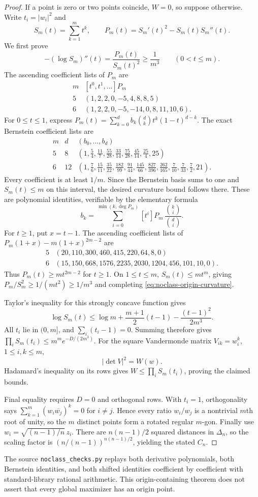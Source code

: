 \begin{proof}
If a point is zero or two points coincide, $W=0$, so suppose otherwise.
Write $t_i=|w_i|^2$ and
\[
 S_m(t)=\sum_{k=1}^m t^k,\qquad
 P_m(t)=S_m'(t)^2-S_m(t)S_m''(t).
\]
We first prove
\begin{equation}\label{eq:noclass-origin-curvature}
 -(\log S_m)''(t)=\frac{P_m(t)}{S_m(t)^2}
 \ge\frac1{m^3}\qquad(0<t\le m).
\end{equation}
The ascending coefficient lists of $P_m$ are
\[
\begin{array}{c|l}
m&[t^0,t^1,\ldots]P_m\\ \hline
5&(1,2,2,0,-5,4,8,8,5)\\
6&(1,2,2,0,-5,-14,0,8,11,10,6).
\end{array}
\]
For $0\le t\le1$, express
$P_m(t)=\sum_{k=0}^{d}b_k\binom dk t^k(1-t)^{d-k}$.
The exact Bernstein coefficient lists are
\[
\begin{array}{c|c|l}
m&d&(b_0,\ldots,b_d)\\ \hline
5&8&
\left(1,\frac54,\frac{11}7,\frac{55}{28},\frac{33}{14},
\frac{75}{28},\frac{45}{14},\frac{25}4,25\right)\\[2pt]
6&12&
\left(1,\frac76,\frac{15}{11},\frac{35}{22},\frac{182}{99},
\frac{91}{44},\frac{145}{66},\frac{827}{396},
\frac{262}{165},\frac7{10},\frac7{33},\frac72,21\right).
\end{array}
\]
Every coefficient is at least $1/m$. Since the Bernstein basis sums
to one and $S_m(t)\le m$ on this interval, the desired curvature
bound follows there. These are polynomial identities, verifiable by
the elementary formula
\[
 b_k=\sum_{i=0}^{\min(k,\deg P_m)}
 [t^i]P_m\,\frac{\binom ki}{\binom di}.
\]
For $t\ge1$, put $x=t-1$. The ascending coefficient lists of
$P_m(1+x)-m(1+x)^{2m-2}$ are
\[
\begin{array}{c|l}
5&(20,110,300,460,415,220,64,8,0)\\
6&(15,150,668,1576,2235,2030,1204,456,101,10,0).
\end{array}
\]
Thus $P_m(t)\ge m t^{2m-2}$ for $t\ge1$. On $1\le t\le m$,
$S_m(t)\le m t^m$, giving
$P_m/S_m^2\ge1/(m t^2)\ge1/m^3$ and completing
\eqref{eq:noclass-origin-curvature}.

Taylor's inequality for this strongly concave function gives
\[
 \log S_m(t)\le\log m+\frac{m+1}{2}(t-1)
                   -\frac{(t-1)^2}{2m^3}.
\]
All $t_i$ lie in $(0,m]$, and $\sum_i(t_i-1)=0$. Summing therefore
gives $\prod_iS_m(t_i)\le m^m e^{-D/(2m^3)}$.
For the square Vandermonde matrix $V_{ik}=w_i^k$, $1\le i,k\le m$,
\[
 |\det V|^2=W(w).
\]
Hadamard's inequality on its rows gives
$W\le\prod_iS_m(t_i)$, proving the claimed bounds.

Final equality requires $D=0$ and orthogonal rows. With $t_i=1$,
orthogonality says
$\sum_{k=1}^m(w_i\overline{w_j})^k=0$ for $i\ne j$.
Hence every ratio $w_i/w_j$ is a nontrivial $m$th root of unity,
so the $m$ distinct points form a rotated regular $m$-gon.
Finally use $w_i=\sqrt{(n-1)/n}\,z_i$. There are
$n(n-1)/2$ squared distances in $\Delta_n$, so the scaling factor
is $(n/(n-1))^{n(n-1)/2}$, yielding the stated $C_n$.
\end{proof}

The source \texttt{noclass\_checks.py} replays both derivative
polynomials, both Bernstein identities, and both shifted identities
coefficient by coefficient with standard-library rational arithmetic.
This origin-containing theorem does not assert that every global
maximizer has an origin point.
